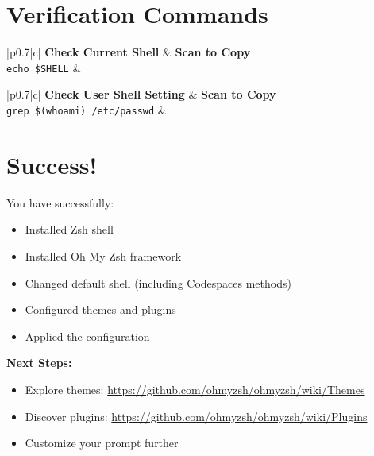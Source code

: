 \documentclass{article}
\begin{document}
\section{Verification Commands}

\begin{table}[h]
\begin{tabular}{|p{}|c|}
\hline
\textbf{Check Current Shell} & \textbf{Scan to Copy} \\
\hline
\texttt{echo \$SHELL} &  \\
\hline
\end{tabular}
\end{table}

\begin{table}[h]
\begin{tabular}{|p{}|c|}
\hline
\textbf{Check User Shell Setting} & \textbf{Scan to Copy} \\
\hline
\texttt{grep \$(whoami) /etc/passwd} &  \\
\hline
\end{tabular}
\end{table}

\section{Success!}

\begin{successbox}
You have successfully:
\begin{itemize}
    \item Installed Zsh shell
    \item Installed Oh My Zsh framework  
    \item Changed default shell (including Codespaces methods)
    \item Configured themes and plugins
    \item Applied the configuration
\end{itemize}

\textbf{Next Steps:}
\begin{itemize}
    \item Explore themes: \url{https://github.com/ohmyzsh/ohmyzsh/wiki/Themes}
    \item Discover plugins: \url{https://github.com/ohmyzsh/ohmyzsh/wiki/Plugins}
    \item Customize your prompt further
\end{itemize}
\end{successbox}
\end{document}
